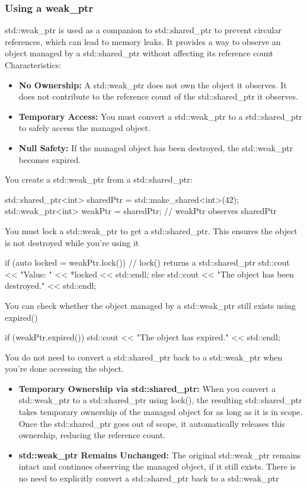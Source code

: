 \documentclass{report}
\begin{document}
\subsubsection{Using a weak\_ptr}
\bigbreak \noindent 
std::weak\_ptr is used as a companion to std::shared\_ptr to prevent circular references, which can lead to memory leaks. It provides a way to observe an object managed by a std::shared\_ptr without affecting its reference count
\bigbreak \noindent 
Characteristics:
\begin{itemize}
    \item \textbf{No Ownership:} A std::weak_ptr does not own the object it observes. It does not contribute to the reference count of the std::shared_ptr it observes.
    \item \textbf{Temporary Access:} You must convert a std::weak_ptr to a std::shared_ptr to safely access the managed object.
    \item \textbf{Null Safety:} If the managed object has been destroyed, the std::weak_ptr becomes expired.
\end{itemize}
\bigbreak \noindent 
You create a std::weak\_ptr from a std::shared\_ptr:
\bigbreak \noindent 
\begin{cppcode}
std::shared_ptr<int> sharedPtr = std::make_shared<int>(42);
std::weak_ptr<int> weakPtr = sharedPtr; // weakPtr observes sharedPtr
\end{cppcode}
\bigbreak \noindent 
You must lock a std::weak\_ptr to get a std::shared\_ptr. This ensures the object is not destroyed while you're using it
\bigbreak \noindent 
\begin{cppcode}
if (auto locked = weakPtr.lock()) { // lock() returns a std::shared_ptr
    std::cout << "Value: " << *locked << std::endl;
} else {
    std::cout << "The object has been destroyed." << std::endl;
}
\end{cppcode}
\bigbreak \noindent 
You can check whether the object managed by a std::weak\_ptr still exists using expired()
\bigbreak \noindent 
\begin{cppcode}
if (weakPtr.expired()) {
    std::cout << "The object has expired." << std::endl;
}
\end{cppcode}
\bigbreak \noindent 
You do not need to convert a std::shared\_ptr back to a std::weak\_ptr when you're done accessing the object.
\begin{itemize}
    \item \textbf{Temporary Ownership via std::shared\_ptr:} When you convert a std::weak\_ptr to a std::shared\_ptr using lock(), the resulting std::shared\_ptr takes temporary ownership of the managed object for as long as it is in scope. Once the std::shared\_ptr goes out of scope, it automatically releases this ownership, reducing the reference count.
    \item \textbf{std::weak\_ptr Remains Unchanged:} The original std::weak\_ptr remains intact and continues observing the managed object, if it still exists. There is no need to explicitly convert a std::shared\_ptr back to a std::weak\_ptr
\end{itemize}
\end{document}
